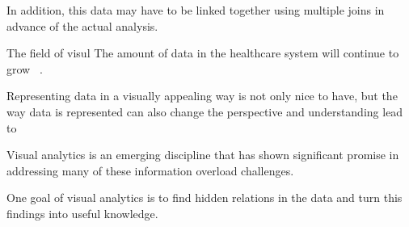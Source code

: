 In addition, this data may have to be linked together using multiple joins in advance of the actual analysis. 

The field of visul The amount of data in the healthcare system will continue to grow ~\cite{Murdoch.2013}. 

Representing data in a visually appealing way is not only nice to have, but the way data is represented can also change the perspective and understanding  lead to 

Visual analytics is an emerging discipline that has shown significant promise in addressing many of these information overload challenges.


One goal of visual analytics is to find hidden relations in the data and turn this findings into useful knowledge.